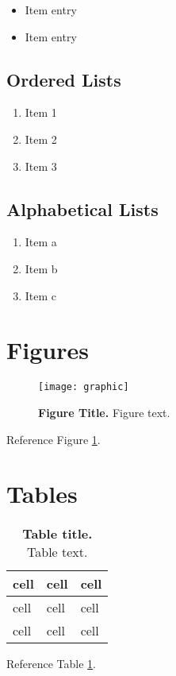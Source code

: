 \begin{itemize}
	\item Item entry
	\item Item entry
\end{itemize}

\subsection{Ordered Lists} \label{ordered-lists}

\begin{enumerate}
	\item Item 1
	\item Item 2
	\item Item 3
\end{enumerate}

\subsection{Alphabetical Lists} \label{alphabetical-list}

\begin{enumerate}[label=(\alph*)]
	\item Item a
	\item Item b
	\item Item c
\end{enumerate}


\section{Figures} \label{figures}

\begin{figure}[hb] \centering
	\texttt{[image: graphic]}
	\caption{\textbf{Figure Title.} Figure text.}
	\label{figure:1}
\end{figure}

Reference Figure \ref{figure:1}.


\section{Tables} \label{tables}

\begin{table}[hb] \centering
\caption{\textbf{Table title.} Table text.}
\label{table:1}
\begin{tabular}{ p{2in} p{2in} p{2in} } 
	\toprule
	
	\textbf{cell} & \textbf{cell} & \textbf{cell} \\ 
	
	\midrule
	
	cell & cell & cell \\ 
	
	\midrule
	
	cell & cell & cell \\
	
	\bottomrule
\end{tabular}
\end{table}

Reference Table \ref{table:1}.
